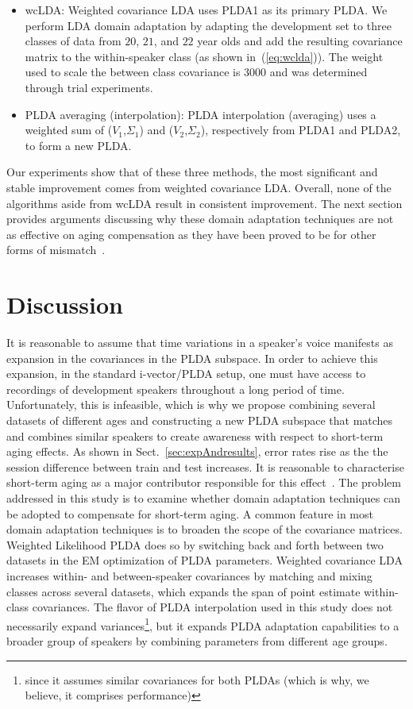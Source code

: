 \documentclass[a4paper]{article}
\begin{document}
\begin{itemize}
\item{wcLDA: Weighted covariance LDA uses PLDA1 as its primary PLDA. We perform LDA domain adaptation by adapting the development set to three classes of data from $20$, $21$, and $22$ year olds and add the resulting covariance matrix to the within-speaker class (as shown in~(\ref{eq:wclda})). The weight used to scale the between class covariance is $3000$ and was determined through trial experiments. }
\end{itemize}


\begin{itemize}
\item{PLDA averaging (interpolation): PLDA interpolation (averaging) uses a weighted sum of ($V_1$,$\Sigma_1$) and ($V_2$,$\Sigma_2$), respectively from PLDA1 and PLDA2, to form a new PLDA.}
\end{itemize}

Our experiments show that of these three methods, the most significant and stable improvement comes from weighted covariance LDA. Overall, none of the algorithms aside from wcLDA result in consistent improvement. The next section provides arguments discussing why these domain adaptation techniques are not as effective on aging compensation as they have been proved to be for other forms of mismatch~\cite{garcia2014supervised}. 


\section{Discussion}
\label{sec:discussion}
It is reasonable to assume that time variations in a speaker's voice manifests as expansion in the covariances in the PLDA subspace. In order to achieve this expansion, in the standard i-vector/PLDA setup, one must have access to recordings of development speakers throughout a long period of time. Unfortunately, this is infeasible, which is why we propose combining several datasets of different ages and constructing a new PLDA subspace that matches and combines similar speakers to create awareness with respect to short-term aging effects. As shown in Sect.~\ref{sec:expAndresults}, error rates rise as the the session difference between train and test increases. It is reasonable to characterise short-term aging as a major contributor responsible for this effect~\cite{kellyinterspeech15}. The problem addressed in this study is to examine whether domain adaptation techniques can be adopted to compensate for short-term aging. A common feature in most domain adaptation techniques is to broaden the scope of the covariance matrices. Weighted Likelihood PLDA does so by switching back and forth between two datasets in the EM optimization of PLDA parameters. Weighted covariance LDA increases within- and between-speaker covariances by matching and mixing classes across several datasets, which expands the span of point estimate within-class covariances. The flavor of PLDA interpolation used in this study does not necessarily expand variances\footnote{since it assumes similar covariances for both PLDAs (which is why, we believe, it comprises performance)}, but it expands PLDA adaptation capabilities to a broader group of speakers by combining parameters from different age groups. 
\end{document}
